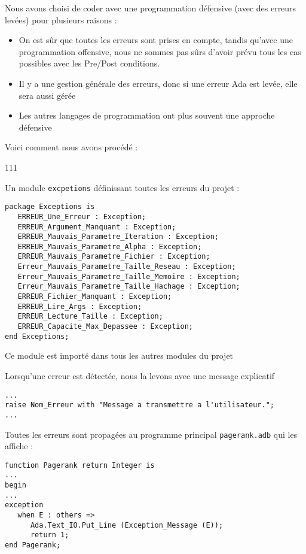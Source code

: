 Nous avons choisi de coder avec une programmation défensive (avec des erreurs levées) pour plusieurs raisons :
\begin{itemize}
   \item On est sûr que toutes les erreurs sont prises en compte, tandis qu'avec une programmation offensive, nous ne sommes pas sûrs d'avoir prévu tous les cas possibles avec les Pre/Post conditions.
   \item Il y a une gestion générale des erreurs, donc si une erreur Ada est levée, elle sera aussi gérée
   \item Les autres langages de programmation ont plus souvent une approche défensive 
\end{itemize}

Voici comment nous avons procédé : 
\begin{dinglist}{111}
   \item Un module \lstinline{excpetions} définissant toutes les erreurs du projet :
   \begin{lstlisting}[caption=Module Exceptions]
package Exceptions is
   ERREUR_Une_Erreur : Exception;
   ERREUR_Argument_Manquant : Exception;
   ERREUR_Mauvais_Parametre_Iteration : Exception;
   ERREUR_Mauvais_Parametre_Alpha : Exception;
   ERREUR_Mauvais_Parametre_Fichier : Exception;
   Erreur_Mauvais_Parametre_Taille_Reseau : Exception;
   Erreur_Mauvais_Parametre_Taille_Memoire : Exception;
   Erreur_Mauvais_Parametre_Taille_Hachage : Exception;
   ERREUR_Fichier_Manquant : Exception;
   ERREUR_Lire_Args : Exception;
   ERREUR_Lecture_Taille : Exception;
   ERREUR_Capacite_Max_Depassee : Exception;
end Exceptions;  
   \end{lstlisting}
   Ce module est importé dans tous les autres modules du projet
   \item Lorsqu'une erreur est détectée, nous la levons avec une message explicatif
   \begin{lstlisting}[caption=Levée d'une exception]
...
raise Nom_Erreur with "Message a transmettre a l'utilisateur.";
...
   \end{lstlisting}
   \item Toutes les erreurs sont propagées au programme principal \lstinline{pagerank.adb} qui les affiche :
   \begin{lstlisting}[caption=Gestion des exceptions]
function Pagerank return Integer is
...
begin
...
exception
   when E : others =>
      Ada.Text_IO.Put_Line (Exception_Message (E));
      return 1;
end Pagerank;
   \end{lstlisting}
\end{dinglist}